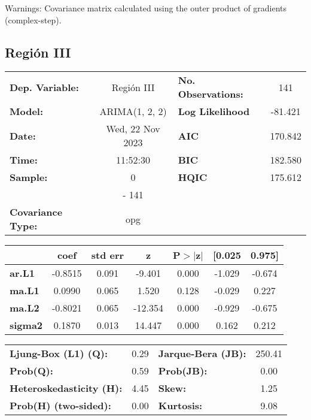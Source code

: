 \documentclass{article}%
\begin{document}
Warnings: \newline
 [1] Covariance matrix calculated using the outer product of gradients (complex-step).%
\subsection*{Región III}%
\begin{center}
\begin{tabular}{lclc}
\toprule
\textbf{Dep. Variable:}          &    Región III    & \textbf{  No. Observations:  } &    141      \\
\textbf{Model:}                  &  ARIMA(1, 2, 2)  & \textbf{  Log Likelihood     } &  -81.421    \\
\textbf{Date:}                   & Wed, 22 Nov 2023 & \textbf{  AIC                } &  170.842    \\
\textbf{Time:}                   &     11:52:30     & \textbf{  BIC                } &  182.580    \\
\textbf{Sample:}                 &        0         & \textbf{  HQIC               } &  175.612    \\
\textbf{}                        &       - 141      & \textbf{                     } &             \\
\textbf{Covariance Type:}        &       opg        & \textbf{                     } &             \\
\bottomrule
\end{tabular}
\begin{tabular}{lcccccc}
                & \textbf{coef} & \textbf{std err} & \textbf{z} & \textbf{P$> |$z$|$} & \textbf{[0.025} & \textbf{0.975]}  \\
\midrule
\textbf{ar.L1}  &      -0.8515  &        0.091     &    -9.401  &         0.000        &       -1.029    &       -0.674     \\
\textbf{ma.L1}  &       0.0990  &        0.065     &     1.520  &         0.128        &       -0.029    &        0.227     \\
\textbf{ma.L2}  &      -0.8021  &        0.065     &   -12.354  &         0.000        &       -0.929    &       -0.675     \\
\textbf{sigma2} &       0.1870  &        0.013     &    14.447  &         0.000        &        0.162    &        0.212     \\
\bottomrule
\end{tabular}
\begin{tabular}{lclc}
\textbf{Ljung-Box (L1) (Q):}     & 0.29 & \textbf{  Jarque-Bera (JB):  } & 250.41  \\
\textbf{Prob(Q):}                & 0.59 & \textbf{  Prob(JB):          } &  0.00   \\
\textbf{Heteroskedasticity (H):} & 4.45 & \textbf{  Skew:              } &  1.25   \\
\textbf{Prob(H) (two-sided):}    & 0.00 & \textbf{  Kurtosis:          } &  9.08   \\
\bottomrule
\end{tabular}
\end{center}
\end{document}
